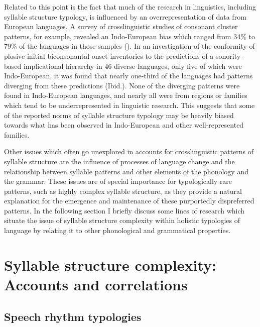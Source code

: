  Related to this point is the fact that much of the research in linguistics, including syllable structure typology, is influenced by an overrepresentation of data from European languages. A survey of crosslinguistic studies of consonant cluster patterns, for example, revealed an Indo-European bias which ranged from 34\% \citep{Morelli1999} to 79\% \citep{Vennemann2012} of the languages in those samples (\citealt{EasterdayNapoleãodeSouza2015}). In an investigation of the conformity of plosive-initial biconsonantal onset inventories to the predictions of a sonority-based implicational hierarchy in 46 diverse languages, only five of which were Indo-European, it was found that nearly one-third of the languages had patterns diverging from these predictions (Ibid.). None of the diverging patterns were found in Indo-European languages, and nearly all were from regions or families which tend to be underrepresented in linguistic research. This suggests that some of the reported norms of syllable structure typology may be heavily biased towards what has been observed in Indo-European and other well-represented families.

  Other issues which often go unexplored in accounts for crosslinguistic patterns of syllable structure are the influence of processes of language change and the relationship between syllable patterns and other elements of the phonology and the grammar. These issues are of special importance for typologically rare patterns, such as highly complex syllable structure, as they provide a natural explanation for the emergence and maintenance of these purportedly dispreferred patterns. In the following section I briefly discuss some lines of research which situate the issue of syllable structure complexity within holistic typologies of language by relating it to other phonological and grammatical properties.

\section{Syllable structure complexity: Accounts and correlations}\label{sec:1.3}
\subsection{Speech rhythm typologies}\label{sec:1.3.1}

